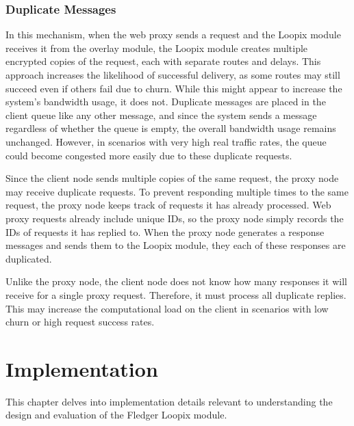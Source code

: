 \documentclass[a4paper,11pt,oneside]{report}
\begin{document}
\subsection{Duplicate Messages}
In this mechanism, when the web proxy sends a request and the Loopix module receives it from the overlay module, the Loopix module creates multiple encrypted copies of the request, each with separate routes and delays. This approach increases the likelihood of successful delivery, as some routes may still succeed even if others fail due to churn. While this might appear to increase the system's bandwidth usage, it does not. Duplicate messages are placed in the client queue like any other message, and since the system sends a message regardless of whether the queue is empty, the overall bandwidth usage remains unchanged. However, in scenarios with very high real traffic rates, the queue could become congested more easily due to these duplicate requests.

Since the client node sends multiple copies of the same request, the proxy node may receive duplicate requests. To prevent responding multiple times to the same request, the proxy node keeps track of requests it has already processed. Web proxy requests already include unique IDs, so the proxy node simply records the IDs of requests it has replied to. When the proxy node generates a response messages and sends them to the Loopix module, they each of these responses are duplicated.

Unlike the proxy node, the client node does not know how many responses it will receive for a single proxy request. Therefore, it must process all duplicate replies. This may increase the computational load on the client in scenarios with low churn or high request success rates.

\chapter{Implementation}
\label{sec:implementation}


This chapter delves into implementation details relevant to understanding the design and evaluation of the Fledger Loopix module.
\end{document}
